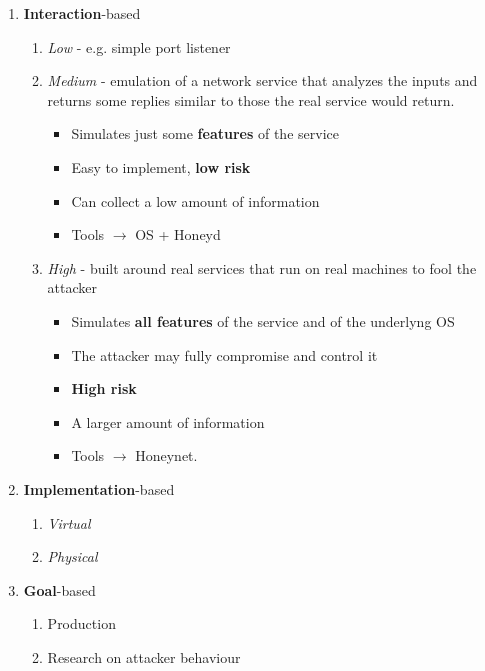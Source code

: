 \begin{enumerate}
   \item \textbf{Interaction}-based
   \begin{enumerate}
      \item \textit{Low} - e.g. simple port listener
      \item \textit{Medium} - emulation of a network service that analyzes the inputs and returns some replies similar to those the real service would return.
      \begin{itemize}
         \item Simulates just some \textbf{features} of the service
         \item Easy to implement, \textbf{low risk}
         \item Can collect a low amount of information
         \item Tools $\longrightarrow$ OS + Honeyd
      \end{itemize}
      \item \textit{High} - built around real services that run on real machines to fool the attacker
      \begin{itemize}
         \item Simulates \textbf{all features} of the service and of the underlyng OS
         \item The attacker may fully compromise and control it
         \item \textbf{High risk}
         \item A larger amount of information
         \item Tools $\longrightarrow$ Honeynet.
      \end{itemize}
   \end{enumerate}
   
   \item \textbf{Implementation}-based
   \begin{enumerate}
      \item \textit{Virtual}
      \item \textit{Physical}
   \end{enumerate}
   
   \item \textbf{Goal}-based
   \begin{enumerate}
      \item Production
      \item Research on attacker behaviour
   \end{enumerate}
\end{enumerate}

